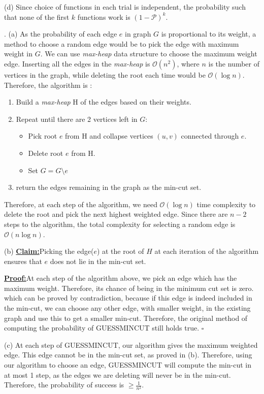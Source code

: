 \documentclass[assign]{article}
\newenvironment{claim}[1]{\noindent\underline{{\bf Claim:}}\space#1}{}
\newenvironment{claimproof}[1]{\par\noindent\underline{{\bf Proof:}}\space#1}{\hfill$\square$}
\begin{document}
\par (d) Since choice of functions in each trial is independent, the probability such that none of the first $k$ functions work is $(1-\mathcal{P})^k$.


\par {}. (a) As the probability of each edge $e$ in graph $G$ is proportional to its weight, a method to choose a random edge would be to pick the edge with maximum weight in $G$.  We can use \emph{max-heap} data structure to choose the maximum weight edge. Inserting all the edges in the \emph{max-heap}  is $\mathcal{O}(n^2)$, where $n$ is the number of vertices in the graph, while deleting the root each time would be $\mathcal{O} (\log n)$. Therefore, the algorithm is :

\begin{enumerate}[i]
  \item Build a \emph{max-heap} H of the edges based on their weights.
  \item Repeat until there are 2 vertices left in $G$:
     \begin{itemize}
        \item Pick root $e$ from H  and collapse vertices $(u,v)$ connected through $e$.
       \item Delete root $e$ from H.
       \item Set $G = G \setminus e$
     \end{itemize}
 \item return the edges remaining in the graph as the min-cut set.
\end{enumerate}

Therefore, at each step of the algorithm, we need $\mathcal{O} (\log n)$ time complexity to delete the root and pick the next highest weighted edge. Since there are $n-2$ steps to the algorithm, the total complexity for selecting a random edge is $\mathcal{O} (n \log n)$.

\par (b) \begin{claim} Picking the edge($e$) at the root of $H$ at each iteration of the algorithm ensures that $e$ does not lie in the min-cut set.
\end{claim}

\begin{claimproof}
At each step of the algorithm above, we pick an edge which has the maximum weight. Therefore, its chance of being in the minimum cut set is zero. which can be proved by contradiction, because if this edge is indeed included in the min-cut, we can choose any other edge, with smaller weight, in the existing graph and use this to get a smaller min-cut. Therefore, the original method of computing the probability of GUESSMINCUT still holds true. 
\end{claimproof}

\par (c) At each step of GUESSMINCUT, our algorithm gives the maximum weighted edge. This edge cannot be in the min-cut set, as proved in (b).  Therefore, using our algorithm to choose an edge, GUESSMINCUT will compute the min-cut in at most 1 step, as the edges we are deleting will never be in the min-cut. Therefore, the probability of success is $\ge \frac{1}{n^2}$.
\end{document}

